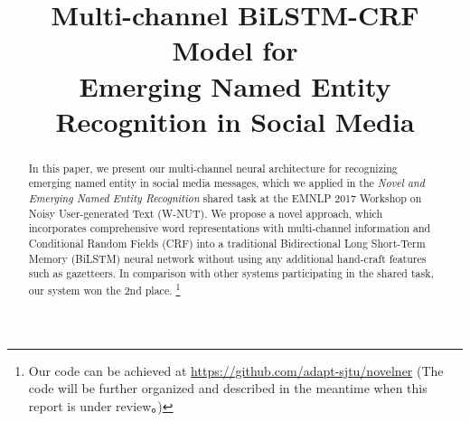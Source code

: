 \documentclass[11pt,letterpaper]{article}
\title{Multi-channel BiLSTM-CRF Model for\\  Emerging Named Entity Recognition in Social Media  }
\author{}
\begin{document}
\maketitle
\begin{abstract}
In this paper, we present our multi-channel neural architecture for recognizing emerging named entity in social media messages,
which we applied in the \textit{Novel and Emerging Named Entity Recognition} shared task 
at the EMNLP
2017 Workshop on Noisy User-generated Text (W-NUT). 
We propose a novel approach, which incorporates comprehensive word representations with multi-channel information and Conditional Random Fields (CRF) into a traditional Bidirectional Long Short-Term Memory
(BiLSTM) neural network
without using any additional hand-craft features such as gazetteers. 
In comparison with other systems participating in the shared task, our system won the 2nd place.
\footnote{Our code can be achieved at \url{https://github.com/adapt-sjtu/novelner}  (The code will be further organized and described in the meantime when this report is under review。)}
\end{abstract}









\end{document}

